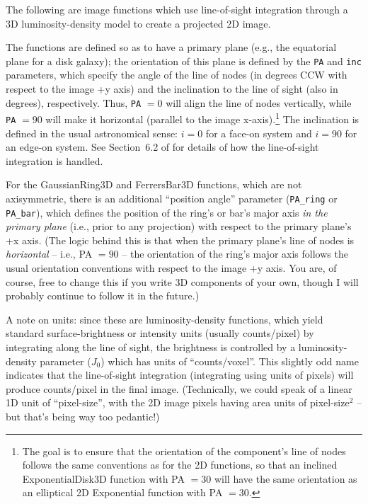 \documentclass[10pt,a4paper,article]{memoir}
\begin{document}
The following are image functions which use line-of-sight
integration through a 3D luminosity-density model to create a projected 2D
image.

The functions are defined so as to have a primary plane (e.g., the
equatorial plane for a disk galaxy); the orientation of this plane is
defined by the \texttt{PA} and \texttt{inc} parameters, which specify
the angle of the line of nodes (in degrees CCW with respect to the image
+y axis) and the inclination to the line of sight (also in degrees),
respectively. Thus, \texttt{PA} $= 0$ will align the line of nodes
vertically, while \texttt{PA} $= 90$ will make it horizontal (parallel
to the image x-axis).\footnote{The goal is to ensure that the
orientation of the component's line of nodes follows the same
conventions as for the 2D functions, so that an inclined
ExponentialDisk3D function with PA $= 30$ will have the same orientation
as an elliptical 2D Exponential function with PA $= 30$.} The
inclination is defined in the usual astronomical sense: $i = 0$ for a
face-on system and $i = 90$ for an edge-on system. See Section~6.2 of
\citet{erwin15} for details of how the line-of-sight integration is
handled.

For the GaussianRing3D and FerrersBar3D functions, which are not
axisymmetric, there is an additional ``position angle'' parameter
(\texttt{PA\_ring} or \texttt{PA\_bar}), which defines the position of
the ring's or bar's major axis \textit{in the primary plane} (i.e., prior to any
projection) with respect to the primary plane's +x axis. (The logic
behind this is that when the primary plane's line of nodes is
\textit{horizontal} -- i.e., PA $= 90$ -- the orientation of the
ring's major axis follows the usual orientation conventions with respect
to the image +y axis. You are, of course, free to change this if you
write 3D components of your own, though I will probably continue to
follow it in the future.)

A note on units: since these are luminosity-density functions, which
yield standard surface-brightness or intensity units (usually
counts/pixel) by integrating along the line of sight, the brightness is
controlled by a luminosity-density parameter ($J_{0}$) which has units
of ``counts/voxel''. This slightly odd name indicates that the
line-of-sight integration (integrating using units of pixels) will
produce counts/pixel in the final image. (Technically, we could speak of
a linear 1D unit of ``pixel-size'', with the 2D image pixels having area
units of pixel-size$^{2}$ -- but that's being way too pedantic!)
\end{document}
